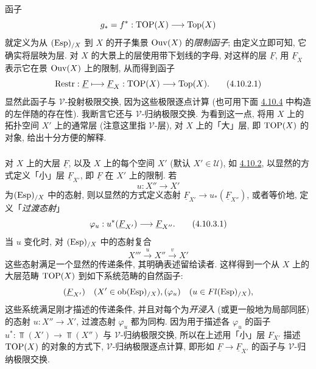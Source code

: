 \subsubsection{}
函子
$$
g_{\ast}=f^{\ast}:\operatorname{TOP}(X)\longrightarrow \operatorname{Top}(X)
$$
就定义为从 $(\operatorname{Esp})_{/X}$ 到 $X$ 的开子集景 $\operatorname{Ouv}(X)$ 的\emph{限制函子}; 由定义立即可知, 它确实将层映为层. 对 $X$ 的大景上的层使用带下划线的字母, 对这样的层 $\underline{F}$, 用 $\underline{F}_X$ 表示它在景 $\operatorname{Ouv}(X)$ 上的限制, 从而得到函子
\begin{equation*}
\operatorname{Restr}:\underline{F}\longmapsto \underline{F}_X:\operatorname{TOP}(X)\longrightarrow
\operatorname{Top}(X){}.\tag{4.10.2.1}
\end{equation*}
显然此函子与 $𝒱$-投射极限交换, 因为这些极限逐点计算 (也可用下面 \hyperref[IV.subsubsec4.10.4]{4.10.4} 中构造的左伴随的存在性). 我断言它还与 $𝒱$-归纳极限交换. 为看到这一点, 将用 $X$ 上的拓扑空间 $X'$ 上的通常层 (注意这里指 $𝒱$-层), 对 $X$ 上的「大」层, 即 $\operatorname{TOP}(X)$ 的对象, 给出十分方便的解释.

\subsubsection{}
对 $X$ 上的大层 $\underline{F}$, 以及 $X$ 上的每个空间 $X'$ (默认 $X'\in 𝒰$), 如 \hyperref[IV.subsubsec4.10.2]{4.10.2}, 以显然的方式定义「小」层 $\underline{F}_{X'}$, 即 $\underline{F}$ 在 $X'$ 上的限制. 若
$$
u:X''\longrightarrow X'
$$
为\pageoriginale $(\operatorname{Esp})_{/X}$ 中的态射, 则以显然的方式定义态射 $\underline{F}_{X'}\rightarrow u_{\ast}(\underline{F}_{X''})$, 或者等价地, 定义「\emph{过渡态射}」
\begin{equation*}
\varphi_u :u^{\ast}(\underline{F}_{X'})\longrightarrow
\underline{F}_{X''}{}. \tag{4.10.3.1}
\end{equation*}
当 $u$ 变化时, 对 $(\operatorname{Esp})_{/X}$ 中的态射复合
$$
X'''\xrightarrow{u}X''\xrightarrow{v}X'
$$
这些态射满足一个显然的传递条件, 其明确表述留给读者. 这样得到一个从 $X$ 上的大层范畴 $\operatorname{TOP}(X)$ 到如下系统范畴的自然函子:
$$
(\underline{F}_{X'})\quad(X'\in \operatorname{ob} (\operatorname{Esp})_{/X}), (\varphi_u)\quad(u\in
Fl(\operatorname{Esp})_{/X}){},
$$
这些系统满足刚才描述的传递条件, 并且对每个为\emph{开浸入} (或更一般地为局部同胚) 的态射 $u:X''\rightarrow X'$, 过渡态射 $\varphi_u$ 都为同构. 因为用于描述各 $\varphi_u$ 的函子 $u^{\ast}:\Top(X')\rightarrow \Top(X'')$ 与 $𝒱$-归纳极限交换, 所以在上述用「小」层 $F_{X'}$ 描述 $\operatorname{TOP}(X)$ 的对象的方式下, $𝒱$-归纳极限逐点计算, 即形如 $\underline{F}\rightarrow \underline{F}_{X'}$ 的函子与 $𝒱$-归纳极限交换.


